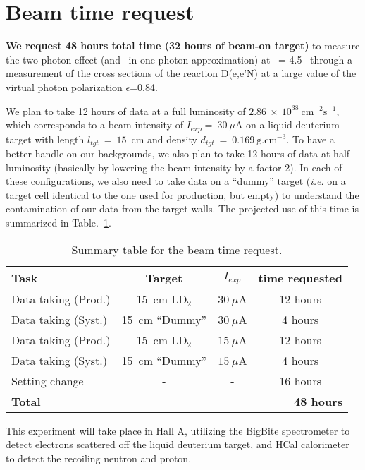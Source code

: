\section{Beam time request}

{\bf We request 48 hours total time (32 hours of beam-on target)} to measure the two-photon effect (and \gen~in one-photon approximation) 
at \qsq~= 4.5 \gevcsq~through a measurement of the cross sections of the reaction D(e,e'N) at a large value of the virtual photon polarization $\epsilon$=0.84.

We plan to take 12 hours of data at a full luminosity of $2.86~\times~10^{38}~\mathrm{cm}^{-2}\mathrm{s}^{-1}$, which corresponds to a beam intensity of $I_{exp} =~30~\mu$A on a liquid deuterium target with length $l_{tgt}~=~15$~cm and density $d_{tgt}~=~0.169~\mathrm{g.cm}^{-3}$. 
To have a better handle on our backgrounds, we also plan to take 12 hours of data at half luminosity (basically by lowering the beam intensity by a factor 2).
In each of these configurations, we also need to take data on a ``dummy'' target ({\it i.e.} on a target cell identical to the one used for production, but empty) to understand the contamination of our data from the target walls. 
The projected use of this time is summarized in Table.~\ref{tab:beamtime}.
%
\begin{center}
\begin{table}[h]
\begin{tabular}{|l|c|c|c|}
\hline
Task & Target & $I_{exp}$ & time requested \\
\hline
Data taking (Prod.) & 15~cm LD$_2$ & $30~\mu$A & 12 hours \\ 
\hline
Data taking (Syst.) & 15~cm ``Dummy'' & $30~\mu$A & 4 hours \\ 
\hline
Data taking (Prod.) & 15~cm LD$_2$ & $15~\mu$A & 12 hours \\ 
\hline
Data taking (Syst.) & 15~cm ``Dummy'' & $15~\mu$A & 4 hours \\ 
\hline
Setting change & - & - & 16 hours \\
\hline
\hline
{\bf Total} & \multicolumn{3}{r|}{\bf 48 hours} \\
\hline
\end{tabular} 
\caption{Summary table for the beam time request.}%
\label{tab:beamtime}
\end{table}
\end{center}
%
This experiment will take place in Hall A, utilizing the BigBite spectrometer to detect electrons scattered off 
the liquid deuterium target, and HCal calorimeter to detect the recoiling neutron and proton.

